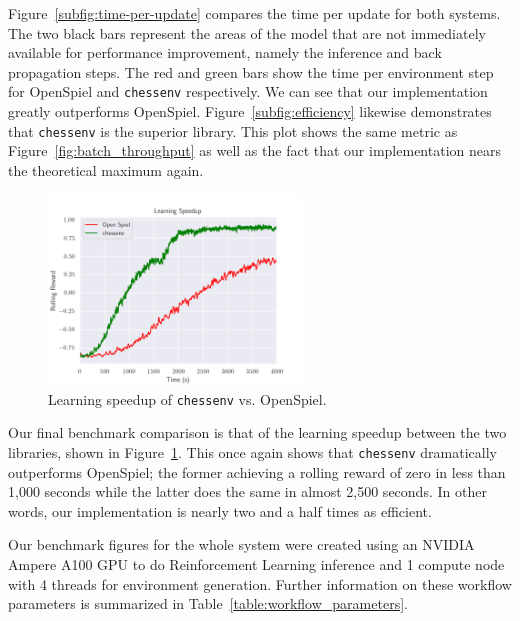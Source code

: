 \documentclass[12pt]{article}
\begin{document}
Figure~\ref{subfig:time-per-update} compares the time per update for both systems. The two black bars represent the areas of the model that are not immediately available for performance improvement, namely the inference and back propagation steps. The red and green bars show the time per environment step for OpenSpiel and \texttt{chessenv} respectively. We can see that our implementation greatly outperforms OpenSpiel. Figure~\ref{subfig:efficiency} likewise demonstrates that \texttt{chessenv} is the superior library. This plot shows the same metric as Figure~\ref{fig:batch_throughput} as well as the fact that our implementation nears the theoretical maximum again.

\begin{figure}[H]
    \centering
    \includegraphics[width=0.6\textwidth]{plots/learning_speedup.png}
    \caption{Learning speedup of \texttt{chessenv} vs. OpenSpiel.}
    \label{fig:learning_speedup}
\end{figure}

Our final benchmark comparison is that of the learning speedup between the two libraries, shown in Figure~\ref{fig:learning_speedup}. This once again shows that \texttt{chessenv} dramatically outperforms OpenSpiel; the former achieving a rolling reward of zero in less than 1,000 seconds while the latter does the same in almost 2,500 seconds. In other words, our implementation is nearly two and a half times as efficient.

Our benchmark figures for the whole system were created using an NVIDIA Ampere A100 GPU to do Reinforcement Learning inference and 1 compute node with 4 threads for environment generation. Further information on these workflow parameters is summarized in Table~\ref{table:workflow_parameters}. 
\end{document}
